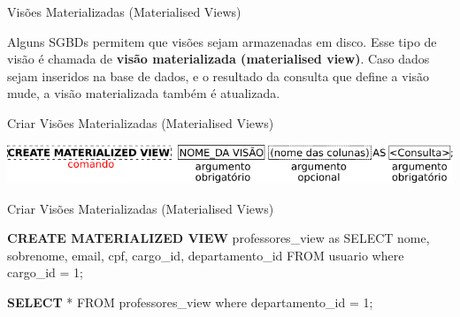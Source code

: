 \documentclass[xcolor=x11names,compress]{beamer}
\begin{document}
\begin{frame}{Visões Materializadas (Materialised Views)}

Alguns SGBDs permitem que visões sejam armazenadas em disco. Esse tipo de visão é chamada de \textbf{visão materializada (materialised view)}. Caso dados sejam inseridos na base de dados, e o resultado da consulta que define a visão mude, a visão materializada também é atualizada.

\end{frame}

\begin{frame}{Criar Visões Materializadas (Materialised Views)}

\centering \includegraphics[keepaspectratio,width=\textwidth]{create_materialised_view}

\end{frame}

\begin{frame}{Criar Visões Materializadas (Materialised Views)}

\begin{alertblock}{}
\textbf{CREATE MATERIALIZED VIEW} professores\_view as SELECT nome, sobrenome, email, cpf, cargo\_id, departamento\_id FROM usuario where cargo\_id = 1;
\end{alertblock}

\begin{alertblock}{}

\textbf{SELECT} * FROM professores\_view where departamento\_id = 1;

\end{alertblock}

\end{frame}

\section{}
\end{document}

